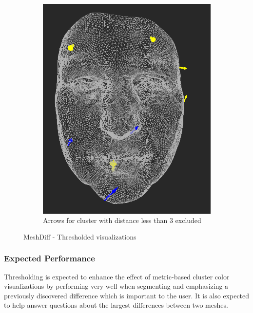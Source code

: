 \begin{figure}[h]
\begin{subfigure}{0.3\textwidth}
	\end{subfigure}
    \qquad
    \begin{subfigure}{0.3\textwidth}
	\includegraphics[width=\textwidth]{./img/meshdiff-thresholding-arrows-length3.PNG}
    \caption{Arrows for cluster with distance less than 3 excluded}
    \label{fig:meshdiff_thresholding_arrows}
	\end{subfigure}
    
\caption[MeshDiff - Thresholded visualizations]{MeshDiff - Thresholded visualizations}
\end{figure}

\subsubsection{Expected Performance}

Thresholding is expected to enhance the effect of metric-based cluster color visualizations by performing very well when segmenting and emphasizing a previously discovered difference which is important to the user. It is also expected to help answer questions about the largest differences between two meshes.
